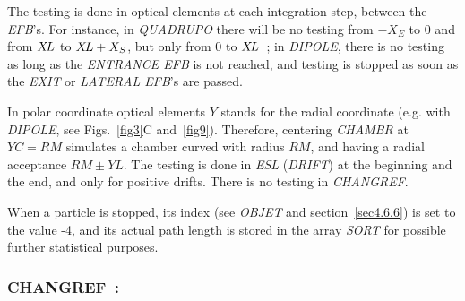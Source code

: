\noindent The testing is done in optical elements at each integration step, between the
\textsl{EFB}'s. For instance, in \textsl{QUADRUPO} there will be 
no testing from $-X_E $ to 0 and 
from $ X\!L $ to $ X\!L+X_S $, but only from 0  to $ X\!L $~;  in \textsl{DIPOLE}, there is no 
testing as long as the \textsl{ENTRANCE EFB} is not reached, and testing is stopped as 
soon as the \textsl{EXIT} or \textsl{LATERAL EFB}'s are passed.  
\bigskip

\noindent In polar coordinate optical elements $ Y $  stands for the radial
coordinate (e.g. with \textsl{DIPOLE}, see Figs.~\ref{fig3}C and~\ref{fig9}).  
 Therefore, centering \textsl{CHAMBR} at $ YC=RM $ simulates a chamber curved with radius 
 $ RM $, and having a radial acceptance $ RM\pm YL $.  The testing  is done in  \textsl{ESL}  
 (\textsl{DRIFT}) at the beginning and the end, and only for positive drifts.  There 
is no testing in \textsl{CHANGREF}.  
\bigskip

\noindent When a particle is stopped, its index 
\IEX{}  (see \textsl{OBJET} and 
section~\ref{sec4.6.6}) is set to the value -4, and its actual path length is stored in the array 
\textsl{SORT} for possible further statistical purposes. 




\newpage

\subsubsection*{CHANGREF~: \CHANGREFTitl} \label{CHANGREF}
\medskip

